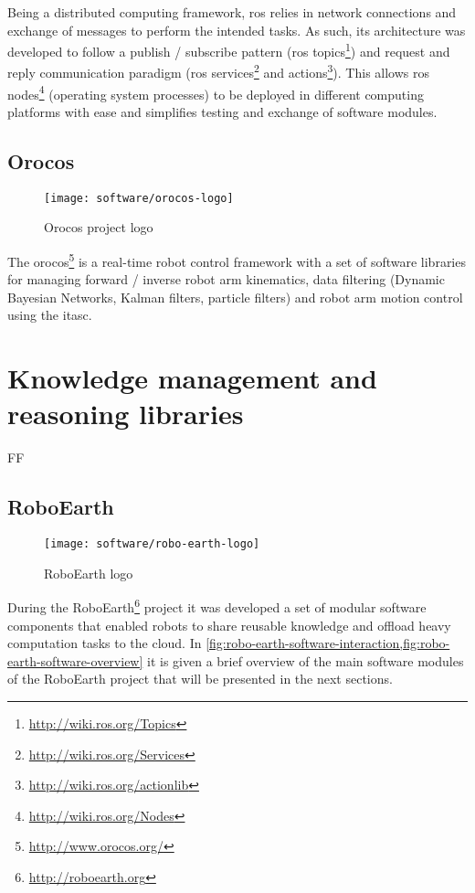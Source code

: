 Being a distributed computing framework, \gls{ros} relies in network connections and exchange of messages to perform the intended tasks. As such, its architecture was developed to follow a publish / subscribe pattern (\gls{ros} topics\footnote{\url{http://wiki.ros.org/Topics}}) and request and reply communication paradigm (\gls{ros} services\footnote{\url{http://wiki.ros.org/Services}} and actions\footnote{\url{http://wiki.ros.org/actionlib}}). This allows \gls{ros} nodes\footnote{\url{http://wiki.ros.org/Nodes}} (operating system processes) to be deployed in different computing platforms with ease and simplifies testing and exchange of software modules.


\subsection{Orocos}

\begin{wrapfigure}{r}{0.23\textwidth}
	\centering
	\vspace*{-2em}
	\texttt{[image: software/orocos-logo]}
	\caption{Orocos project logo}
	\label{fig:orocos-logo}
\end{wrapfigure}

The \gls{orocos}\footnote{\url{http://www.orocos.org/}} is a real-time robot control framework with a set of software libraries for managing forward / inverse robot arm kinematics, data filtering (Dynamic Bayesian Networks, Kalman filters, particle filters) and robot arm motion control using the \gls{itasc}.




\section{Knowledge management and reasoning libraries}

FF

\subsection{RoboEarth}

\begin{wrapfigure}{r}{0.23\textwidth}
	\centering
	\vspace*{-2em}
	\texttt{[image: software/robo-earth-logo]}
	\caption{RoboEarth logo}
	\label{fig:robo-earth-logo}
\end{wrapfigure}

During the RoboEarth\footnote{\url{http://roboearth.org}} project it was developed a set of modular software components that enabled robots to share reusable knowledge and offload heavy computation tasks to the cloud. In \cref{fig:robo-earth-software-interaction,fig:robo-earth-software-overview} it is given a brief overview of the main software modules of the RoboEarth project that will be presented in the next sections.


